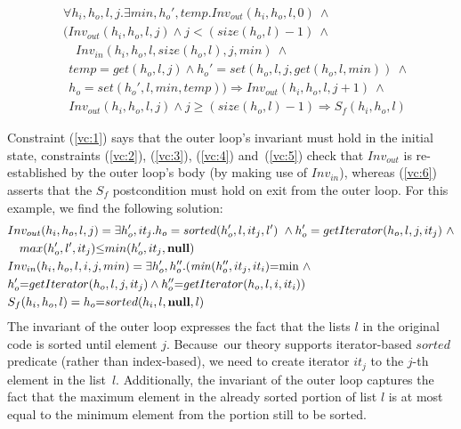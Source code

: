 \documentclass[runningheads,a4paper]{llncs}
\begin{document}
{\small 
\begin{align}
& \forall h_i,h_o,l,j. \exists min, h_o', temp. Inv_{out}(h_i,h_o,l, 0) ~\wedge \label{vc:1}\\
& (Inv_{out}(h_i,h_o,l, j) \wedge j {<} (size(h_o,l){-}1) ~\wedge \label{vc:2}\\
& \quad Inv_{in}(h_i,h_o,l, size(h_o,l), j, min) ~\wedge \label{vc:3}\\ 
& ~~ temp {=} get(h_o,l, j) \wedge h_o' {=} set(h_o,l, j,get(h_o,l, min)) ~\wedge \label{vc:4}\\
& ~~  h_o{=} set(h_o',l, min, temp)) \Rightarrow Inv_{out}(h_i,h_o,l,j{+}1) ~\wedge \label{vc:5}\\
& ~~ Inv_{out}(h_i,h_o,l,j) \wedge j {\geq} (size(h_o,l){-}1) \Rightarrow S_f(h_i,h_o,l) \label{vc:6}
\end{align}
}

Constraint (\ref{vc:1}) says that the outer loop's invariant
must hold in the initial state, constraints (\ref{vc:2}), (\ref{vc:3}), (\ref{vc:4})
and~(\ref{vc:5}) check that $\mathit{Inv}_\mathit{out}$ is re-established by
the outer loop's body (by making use of $\mathit{Inv}_\mathit{in}$), whereas
(\ref{vc:6}) asserts that the $S_f$ postcondition must hold on exit
from the outer loop.  For this example, we find the following solution:
%
{\small \begin{align*} &
Inv_{out}(h_i,h_o,l, j) = \exists h_o', it_{j}.
h_o = sorted(h_o',l,it_{j},l') ~\wedge  h_o' =
getIterator(h_o,l,j,it_{j}) ~\wedge \\
& \quad max(h_o',l',it_{j})
{\leq} min(h_o',it_{j},\hnull) \\
%
& Inv_{in}(h_i,h_o,l,i,j,min) = \exists h_o',h_o''.(\hmin(h_o'',it_{j},it_{i}) {=} \code{min} ~\wedge\\
& h_o'{=}getIterator(h_o,l,j,it_{j}) \wedge h_o''{=}getIterator(h_o,l,i,it_{i}))\\
%
&S_f(h_i,h_o,l) = h_o{=}sorted(h_i,l, \hnull,l)
\end{align*}
}
The invariant of the outer loop expresses the fact that the lists
$l$ in the original code is 
sorted until element $j$.  Because~our theory \logic supports iterator-based
$sorted$ predicate (rather than index-based), we need to create
iterator $it_{j}$ to the $j$-th element in the list~$l$.
Additionally, the invariant of the outer loop
captures the fact that the maximum element in the already sorted portion of
list $l$ is at most equal to the minimum element from the portion still to
be sorted.
\end{document}
